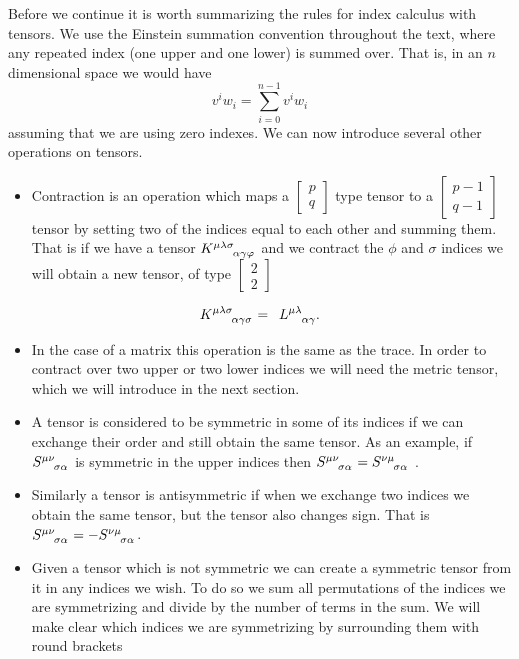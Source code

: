Before we continue it is worth summarizing the rules for index calculus with tensors. We use the Einstein summation convention throughout the text, where any repeated index (one upper and one lower) is summed over. That is, in an \(n\) dimensional space we would have 
\begin{equation} \label{summation-convention}
	v^i w_i = \sum_{i=0}^{n-1} v^i w_i
\end{equation}
assuming that we are using zero indexes. We can now introduce several other operations on tensors.
\begin{itemize}
	\item Contraction is an operation which maps a \( \left[ \begin{smallmatrix} p \\ q \end{smallmatrix} \right] \) type tensor to a \( \left[ \begin{smallmatrix} p-1 \\ q-1 \end{smallmatrix} \right] \) tensor by setting two of the indices equal to each other and summing them. That is if we have a tensor \( K\indices{^\mu^\lambda^\sigma_\alpha_\gamma_\phi}\) and we contract the \(\phi\) and \(\sigma\) indices we will obtain a new tensor, of type \( \left[ \begin{smallmatrix} 2 \\ 2 \end{smallmatrix} \right] \) \cite{carroll}
\end{itemize}
\begin{equation} \label{contration}
	K\indices{^\mu^\lambda^\sigma_\alpha_\gamma_\sigma} = \,\,\, L\indices{^\mu^\lambda_\alpha_\gamma} .
\end{equation}
\begin{itemize}
	\item[] In the case of a matrix this operation is the same as the trace. In order to contract over two upper or two lower indices we will need the metric tensor, which we will introduce in the next section.
	\item A tensor is considered to be symmetric in some of its indices if we can exchange their order and still obtain the same tensor. As an example, if \(S\indices{^\mu^\nu_\sigma_\alpha}\) is symmetric in the upper indices then \(S\indices{^\mu^\nu_\sigma_\alpha} = S\indices{^\nu^\mu_\sigma_\alpha}\) \cite{carroll}.
	\item Similarly a tensor is antisymmetric if when we exchange two indices we obtain the same tensor, but the tensor also changes sign. That is \(S\indices{^\mu^\nu_\sigma_\alpha} = -S\indices{^\nu^\mu_\sigma_\alpha}\).
	\item Given a tensor which is not symmetric we can create a symmetric tensor from it in any indices we wish. To do so we sum all permutations of the indices we are symmetrizing and divide by the number of terms in the sum. We will make clear which indices we are symmetrizing by surrounding them with round brackets \cite{carroll}
\end{itemize}
